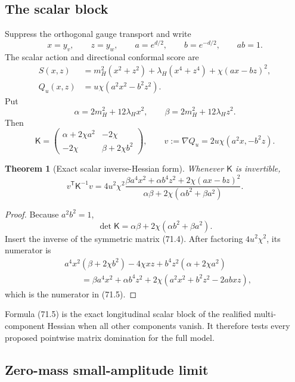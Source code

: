 \documentclass[11pt]{article}
\newtheorem{theorem}{Theorem}[section]
\theoremstyle{remark}
\begin{document}
\subsection{The scalar block}

Suppress the orthogonal gauge transport and write
\[
 x=y_v,\qquad z=y_w,\qquad
 a=e^{d/2},\qquad b=e^{-d/2},\qquad ab=1.          \tag{71.1}
\]
The scalar action and directional conformal score are
\[
\begin{aligned}
 S(x,z)&=m_H^2(x^2+z^2)+\lambda_H(x^4+z^4)
        +\chi(ax-bz)^2,\\
 Q_u(x,z)&=u\chi(a^2x^2-b^2z^2).                 \tag{71.2}
\end{aligned}
\]
Put
\[
 \alpha=2m_H^2+12\lambda_Hx^2,
 \qquad
 \beta=2m_H^2+12\lambda_Hz^2.                   \tag{71.3}
\]
Then
\[
 \mathsf K=
 \begin{pmatrix}
  \alpha+2\chi a^2&-2\chi\\
  -2\chi&\beta+2\chi b^2
 \end{pmatrix},
 \qquad
 v:=\nabla Q_u=2u\chi(a^2x,-b^2z).               \tag{71.4}
\]

\begin{theorem}[Exact scalar inverse-Hessian form]
\label{thm:v17v71-exact}
Whenever \(\mathsf K\) is invertible,
\[
\boxed{
 v^{\mathsf T}\mathsf K^{-1}v
 =4u^2\chi^2
 \frac{
  \beta a^4x^2+\alpha b^4z^2+2\chi(ax-bz)^2}
 {\alpha\beta+2\chi(\alpha b^2+\beta a^2)}.}      \tag{71.5}
\]
\end{theorem}

\begin{proof}
Because \(a^2b^2=1\),
\[
 \det\mathsf K
 =\alpha\beta+2\chi(\alpha b^2+\beta a^2).       \tag{71.6}
\]
Insert the inverse of the symmetric matrix (71.4).  After factoring
\(4u^2\chi^2\), its numerator is
\[
\begin{aligned}
 &a^4x^2(\beta+2\chi b^2)
 -4\chi xz
 +b^4z^2(\alpha+2\chi a^2)\\
 &\qquad=
 \beta a^4x^2+\alpha b^4z^2
 +2\chi(a^2x^2+b^2z^2-2abxz),
\end{aligned}
\]
which is the numerator in (71.5).
\end{proof}

Formula (71.5) is the exact longitudinal scalar block of the
realified multi-component Hessian when all other components vanish.
It therefore tests every proposed pointwise matrix domination for the
full model.

\subsection{Zero-mass small-amplitude limit}
\end{document}
